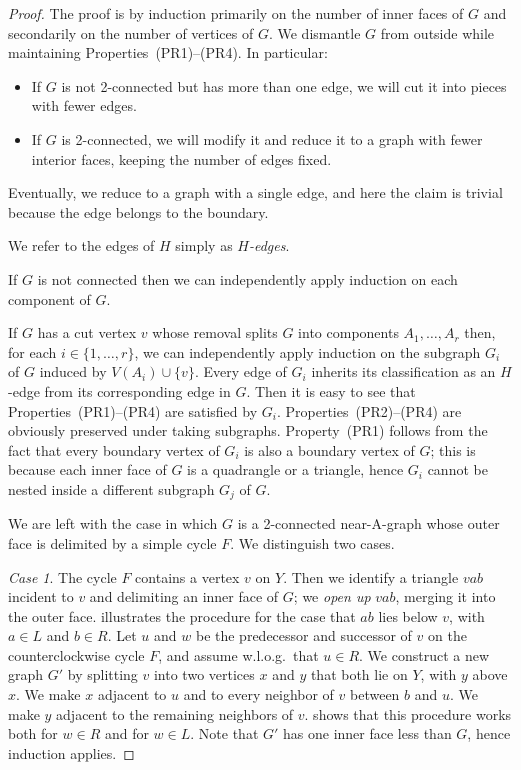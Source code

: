 \begin{proof}
	The proof is by induction primarily on the number of inner faces of $G$ and secondarily on the number of vertices of $G$. We dismantle $G$
	from outside while maintaining
	Properties~(PR1)--(PR4). In particular:
	\begin{itemize}
		\item If $G$ is not 2-connected but has more than one
                  edge, we will cut it
		into pieces with fewer edges.
		\item If $G$ is 2-connected, we will modify it and reduce it to a
		graph
		with fewer interior faces,
		keeping the number of edges fixed.
	\end{itemize}
	Eventually, we reduce to a graph with a single edge, and here the
	claim is trivial because the edge belongs to the boundary.
	
	We refer to the edges of $H$ simply as \emph{$H$-edges}.
	
	If $G$ is not connected then we can independently apply induction on each component
	of $G$. 
	
	If $G$ has a cut vertex $v$ whose removal
	splits $G$ into components $A_1,\ldots,A_r$ then, for each
	$i\in\{1,\ldots,r\}$, we can independently apply induction on the subgraph $G_i$ of $G$
	induced by $V(A_i)\cup\{v\}$. Every edge of $G_i$ inherits its
        classification as an $H$-edge from its corresponding edge in
        $G$.
        Then it is easy to see that Properties~(PR1)--(PR4) are
        satisfied by $G_i$.
        Properties~(PR2)--(PR4) are obviously preserved under taking subgraphs. 
        Property~(PR1) follows from the fact that every boundary vertex of $G_i$ is also a boundary vertex of $G$; this is because each inner face of $G$ is a quadrangle or a triangle, hence $G_i$ cannot be nested inside a different subgraph $G_j$ of $G$.
		
	We are left with the case in which $G$ is a 2-connected near-A-graph whose outer face 
	is delimited by a simple cycle $F$. We distinguish two cases.
	
	{\em Case 1}. The cycle $F$ contains a vertex $v$ on $Y$. Then
        we identify a triangle $vab$ incident to $v$ and delimiting an
        inner face of $G$; we \emph{open up} $vab$, merging it into the outer face.  illustrates the procedure for the case that $ab$ lies below $v$, with $a\in L$ and $b\in R$. Let $u$ and $w$ be the predecessor and successor of $v$ on the
	counterclockwise cycle $F$, and assume w.l.o.g.\ that $u\in R$.
	We construct a new graph $G'$ by splitting $v$ into two vertices $x$
	and $y$ that both lie on $Y$, with $y$ above $x$. We make $x$ adjacent to $u$ and to every neighbor of $v$ between $b$ and $u$.
	We make $y$ adjacent to the remaining neighbors of $v$.
	 shows that this procedure works both for $w\in R$
	and for $w\in L$. Note that $G'$ has one inner face less than $G$, hence induction applies.
		

\end{proof}
